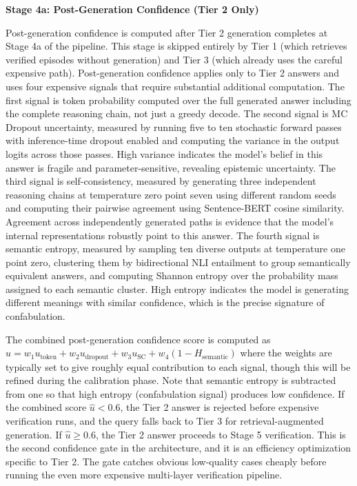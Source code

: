 \documentclass[11pt,a4paper]{article}
\newcommand{\uhat}{\hat{u}}
\begin{document}
{\textbf{Stage 4a: Post-Generation Confidence (Tier 2 Only)}

Post-generation confidence is computed after Tier 2 generation completes at Stage 4a of the pipeline. This stage is skipped entirely by Tier 1 (which retrieves verified episodes without generation) and Tier 3 (which already uses the careful expensive path). Post-generation confidence applies only to Tier 2 answers and uses four expensive signals that require substantial additional computation. The first signal is token probability computed over the full generated answer including the complete reasoning chain, not just a greedy decode. The second signal is MC Dropout uncertainty, measured by running five to ten stochastic forward passes with inference-time dropout enabled and computing the variance in the output logits across those passes. High variance indicates the model's belief in this answer is fragile and parameter-sensitive, revealing epistemic uncertainty. The third signal is self-consistency, measured by generating three independent reasoning chains at temperature zero point seven using different random seeds and computing their pairwise agreement using Sentence-BERT cosine similarity. Agreement across independently generated paths is evidence that the model's internal representations robustly point to this answer. The fourth signal is semantic entropy, measured by sampling ten diverse outputs at temperature one point zero, clustering them by bidirectional NLI entailment to group semantically equivalent answers, and computing Shannon entropy over the probability mass assigned to each semantic cluster. High entropy indicates the model is generating different meanings with similar confidence, which is the precise signature of confabulation.

The combined post-generation confidence score is computed as $\uhat = w_1 u_{\text{token}} + w_2 u_{\text{dropout}} + w_3 u_{\text{SC}} + w_4(1 - H_{\text{semantic}})$ where the weights are typically set to give roughly equal contribution to each signal, though this will be refined during the calibration phase. Note that semantic entropy is subtracted from one so that high entropy (confabulation signal) produces low confidence. If the combined score $\uhat < 0.6$, the Tier 2 answer is rejected before expensive verification runs, and the query falls back to Tier 3 for retrieval-augmented generation. If $\uhat \geq 0.6$, the Tier 2 answer proceeds to Stage 5 verification. This is the second confidence gate in the architecture, and it is an efficiency optimization specific to Tier 2. The gate catches obvious low-quality cases cheaply before running the even more expensive multi-layer verification pipeline.

}
\end{document}
